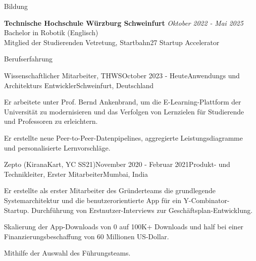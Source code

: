 \documentclass[
	a4paper, %
	10pt, %
]{resume} %
\begin{document}

\begin{rSection}{Bildung}

	\textbf{Technische Hochschule Würzburg Schweinfurt} \hfill \textit{Oktober 2022 - Mai 2025} \\
	Bachelor in Robotik (Englisch) \\
	Mitglied der Studierenden Vetretung, Startbahn27 Startup Accelerator \\

\end{rSection}


\begin{rSection}{Berufserfahrung}

	\begin{rSubsection}{Wissenschaftlicher Mitarbeiter, THWS}{October 2023 - Heute}{Anwendungs und Architekturs Entwickler}{Schweinfurt, Deutschland}
		\item Er arbeitete unter Prof. Bernd Ankenbrand, um die E-Learning-Plattform der Universität zu modernisieren und das Verfolgen von Lernzielen für Studierende und Professoren zu erleichtern.
		\item Er erstellte neue Peer-to-Peer-Datenpipelines, aggregierte Leistungsdiagramme und personalisierte Lernvorschläge.
	\end{rSubsection}


	\begin{rSubsection}{Zepto (KiranaKart, YC SS21)}{November 2020 - Februar 2021}{Produkt- und Technikleiter, Erster Mitarbeiter}{Mumbai, India}
		\item Er erstellte als erster Mitarbeiter des Gründerteams die grundlegende Systemarchitektur und die benutzerorientierte App für ein Y-Combinator-Startup. Durchführung von Erstnutzer-Interviews zur Geschäftsplan-Entwicklung.
		\item Skalierung der App-Downloads von 0 auf 100K+ Downloads und half bei einer Finanzierungsbeschaffung von 60 Millionen US-Dollar.
		\item Mithilfe der Auswahl des Führungsteams.

	\end{rSubsection}

\end{rSection}
\end{document}
